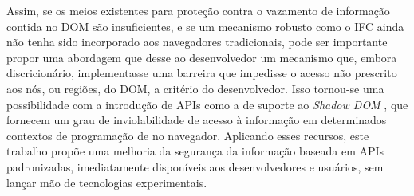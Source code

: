 Assim, se os meios existentes para proteção contra o vazamento de informação contida no DOM são insuficientes, e se um mecanismo robusto como o IFC ainda não tenha sido incorporado aos navegadores tradicionais, pode ser importante propor uma abordagem que desse ao desenvolvedor um mecanismo que, embora discricionário, implementasse uma barreira que impedisse o acesso não prescrito aos nós, ou regiões, do DOM, a critério do desenvolvedor. Isso tornou-se uma possibilidade com a introdução de APIs como a de suporte ao \textit{Shadow DOM} \cite{W3C:ShadowDOM}, que fornecem um grau de inviolabilidade de acesso à informação em determinados contextos de programação de \scripts{} no navegador. Aplicando esses recursos, este trabalho propõe uma melhoria da segurança da informação baseada em APIs padronizadas, imediatamente disponíveis aos desenvolvedores e usuários, sem lançar mão de tecnologias experimentais.